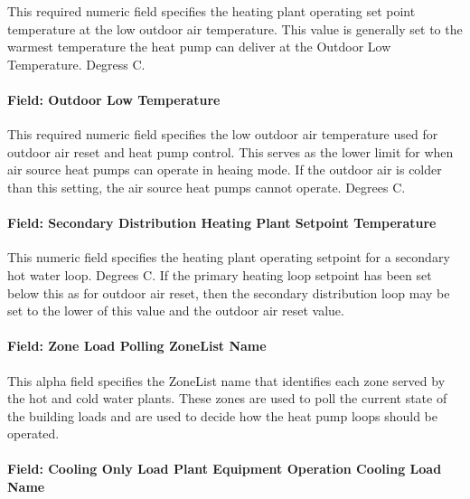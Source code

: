 This required numeric field specifies the heating plant operating set point temperature at the low outdoor air temperature. This value is generally set to the warmest temperature the heat pump can deliver at the Outdoor Low Temperature.  Degress C.

\paragraph{Field: Outdoor Low Temperature}\label{field-hot-water-setpoint-reset-ratio-plantequipmentoperationchillerheaterchangeover}

This required numeric field specifies the low outdoor air temperature used for outdoor air reset and heat pump control.  This serves as the lower limit for when air source heat pumps can operate in heaing mode.  If the outdoor air is colder than this setting, the air source heat pumps cannot operate.  Degrees C.

\paragraph{Field: Secondary Distribution Heating Plant Setpoint Temperature}\label{secondary-distribution-heating-plant-setpoint-temperature}

This numeric field specifies the heating plant operating setpoint for a secondary hot water loop.  Degrees C.  If the primary heating loop setpoint has been set below this as for outdoor air reset, then the secondary distribution loop may be set to the lower of this value and the outdoor air reset value. 

\paragraph{Field: Zone Load Polling ZoneList Name}\label{field-zone-load-polling-zonelist-name-plantequipmentoperationchillerheaterchangeover}

This alpha field specifies the ZoneList name that identifies each zone served by the hot and cold water plants. These zones are used to poll the current state of the building loads and are used to decide how the heat pump loops should be operated. 

\paragraph{Field: Cooling Only Load Plant Equipment Operation Cooling Load Name}\label{field-cool-only-load-equip-operation-name-plantequipmentoperationchillerheaterchangeover}

